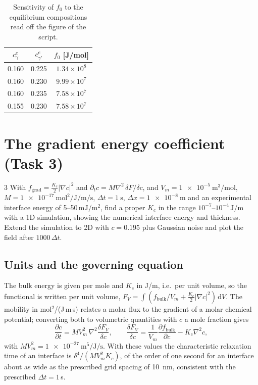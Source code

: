 \documentclass[11pt,a4paper]{article}
\numberwithin{equation}{section}
\theoremstyle{remark}
\newcommand{\fd}[2]{\frac{\delta #1}{\delta #2}}
\newcommand{\fb}{f_{\mathrm{bulk}}}
\newcommand{\fg}{f_{\mathrm{grad}}}
\newcommand{\cg}{c^{e}_{\gamma}}
\newcommand{\cgp}{c^{e}_{\gamma'}}
\begin{document}
\begin{table}[ht]
  \centering
  \caption{Sensitivity of $f_0$ to the equilibrium compositions read off the figure of the script.}
  \label{tab:f0sens}
  \begin{tabular}{ccc}
    \toprule
    $\cg$ & $\cgp$ & $f_0$ [J/mol] \\
    \midrule
    0.160 & 0.225 & $1.34\times10^{8}$ \\
    0.160 & 0.230 & $9.99\times10^{7}$ \\
    0.160 & 0.235 & $7.58\times10^{7}$ \\
    0.155 & 0.230 & $7.58\times10^{7}$ \\
    \bottomrule
  \end{tabular}
\end{table}

\section{The gradient energy coefficient (Task 3)}\label{sec:task3}

\begin{task}{3}
  With $\fg = \tfrac{K_c}{2}|\nabla c|^2$ and $\partial_t c = M\nabla^2\,\delta F/\delta c$, and
  $V_m = \SI{1e-5}{\cubic\metre\per\mole}$,
  $M = \SI{1e-17}{\mole\squared\per\joule\per\metre\per\second}$, $\Delta t = \SI{1}{\second}$,
  $\Delta x = \SI{1e-8}{\metre}$ and an experimental interface energy of 5--50\,mJ/m$^2$, find a proper
  $K_c$ in the range $10^{-7}$--$10^{-4}$\,J/m with a 1D simulation, showing the numerical interface
  energy and thickness. Extend the simulation to 2D with $c = 0.195$ plus Gaussian noise and plot the
  field after $1000\,\Delta t$.
\end{task}

\subsection{Units and the governing equation}\label{sec:units}

The bulk energy is given per mole and $K_c$ in J/m, i.e.\ per unit volume, so the functional is
written per unit volume, $F_V = \int(\fb/V_m + \tfrac{K_c}{2}|\nabla c|^2)\,\mathrm{d}V$. The mobility in
mol$^2$/(J\,m\,s) relates a molar flux to the gradient of a molar chemical potential; converting both to
volumetric quantities with $c$ a mole fraction gives
\begin{equation}\label{eq:chunits}
  \frac{\partial c}{\partial t} = MV_m^2\,\nabla^2\fd{F_V}{c},
  \qquad
  \fd{F_V}{c} = \frac{1}{V_m}\frac{\partial\fb}{\partial c} - K_c\nabla^2c,
\end{equation}
with $MV_m^2 = \SI{1e-27}{\metre\tothe{5}\per\joule\per\second}$. With these values the characteristic
relaxation time of an interface is $\delta^4/(MV_m^2K_c)$, of the order of one second for an interface about as wide as the
prescribed grid spacing of \SI{10}{\nano\metre}, consistent with the prescribed $\Delta t = 1$\,s.
\end{document}

